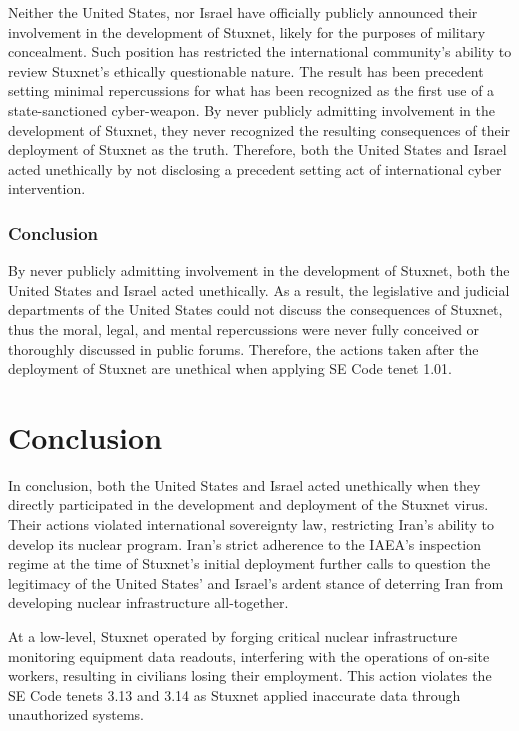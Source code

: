 \documentclass[12pt]{article}
\begin{document}
\begin{multicols}{2}
Neither the United States, nor Israel have officially publicly announced their involvement in the development of Stuxnet, likely for the purposes of military concealment. Such position has restricted the international community's ability to review Stuxnet's ethically questionable nature. The result has been precedent setting minimal repercussions for what has been recognized as the first use of a state-sanctioned cyber-weapon. By never publicly admitting involvement in the development of Stuxnet, they never recognized the resulting consequences of their deployment of Stuxnet as the truth. Therefore, both the United States and Israel acted unethically by not disclosing a precedent setting act of international cyber intervention.

\subsubsection{Conclusion}

By never publicly admitting involvement in the development of Stuxnet, both the United States and Israel acted unethically. As a result, the legislative and judicial departments of the United States could not discuss the consequences of Stuxnet, thus the moral, legal, and mental repercussions were never fully conceived or thoroughly discussed in public forums. Therefore, the actions taken after the deployment of Stuxnet are unethical when applying SE Code tenet 1.01.


\section{Conclusion}

In conclusion, both the United States and Israel acted unethically when they directly participated in the development and deployment of the Stuxnet virus. Their actions violated international sovereignty law, restricting Iran's ability to develop its nuclear program. Iran's strict adherence to the IAEA's inspection regime at the time of Stuxnet's initial deployment further calls to question the legitimacy of the United States' and Israel's ardent stance of deterring Iran from developing nuclear infrastructure all-together.

At a low-level, Stuxnet operated by forging critical nuclear infrastructure monitoring equipment data readouts, interfering with the operations of on-site workers, resulting in civilians losing their employment. This action violates the SE Code tenets 3.13 and 3.14 as Stuxnet applied inaccurate data through unauthorized systems.


\end{multicols}
\end{document}
